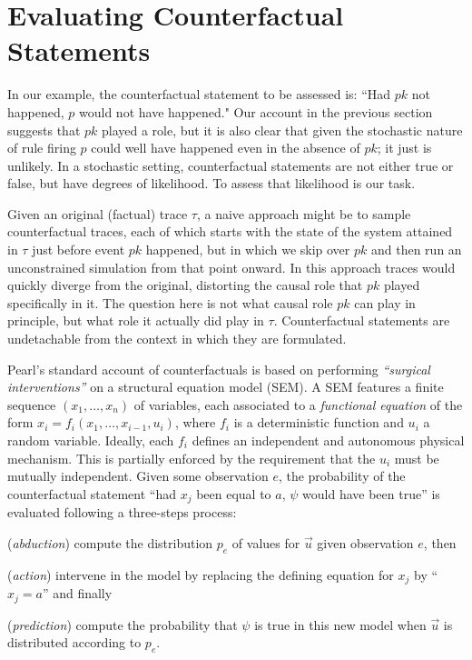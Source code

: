 
\newcommand{\PCFST}[0]{\ProbParen{\CFST{}}}

\newcommand{\ItAbduction}[0]{(\textit{abduction})}
\newcommand{\ItAction}[0]{(\textit{action})}
\newcommand{\ItPrediction}[0]{(\textit{prediction})}


\section{Evaluating Counterfactual
  Statements}\label{sec:counterfactual}

In our example, the counterfactual statement to be
assessed is: ``Had $pk$ not happened, $p$ would not have happened."
Our account in the previous section suggests that $pk$ played a role,
but it is also clear that given the stochastic nature of rule firing
$p$ could well have happened even in the absence of $pk$; it just is
unlikely. In a stochastic setting, counterfactual statements are not
either true or false, but have degrees of likelihood. To assess that
likelihood is our task.

Given an original (factual) trace $\tau$, a naive approach might be to sample
counterfactual traces, each of which starts with the state of the system
attained in $\tau$ just before event $pk$ happened, but in which we skip over
$pk$ and then run an unconstrained simulation from that point onward. In this
approach traces would quickly diverge from the original, distorting the causal
role that $pk$ played specifically in it. The question here is not what causal
role $pk$ can play in principle, but what role it actually did play in $\tau$.
Counterfactual statements are undetachable from the context in which they are
formulated.

Pearl's standard account of counterfactuals \cite{pearl2009causality}
is based on performing \textit{``surgical interventions''} on a
structural equation model (SEM). A SEM features a finite sequence
$(x_1, \dots, x_n)$ of variables, each associated to a
\emph{functional equation} of the form
$x_i = f_i(x_1, \dots, x_{i-1}, u_i)$, where $f_i$ is a deterministic
function and $u_i$ a random variable. Ideally, each $f_i$ defines an
independent and autonomous physical mechanism. This is partially
enforced by the requirement that the $u_i$ must be mutually
independent. Given some observation $e$, the probability of the
counterfactual statement ``had $x_j$ been equal to $a$, $\psi$ would
have been true'' is evaluated following a three-steps process:
\begin{inparaenum}[]
\item \ItAbduction{} compute the distribution $p_e$ of values for
  $\vec u$ given observation $e$, then
\item \ItAction{} intervene in the model by replacing the defining
  equation for $x_j$ by ``$x_j = a$'' and finally
\item \ItPrediction{} compute the probability that $\psi$ is true in
  this new model when $\vec{u}$ is distributed according to $p_e$.
\end{inparaenum}

